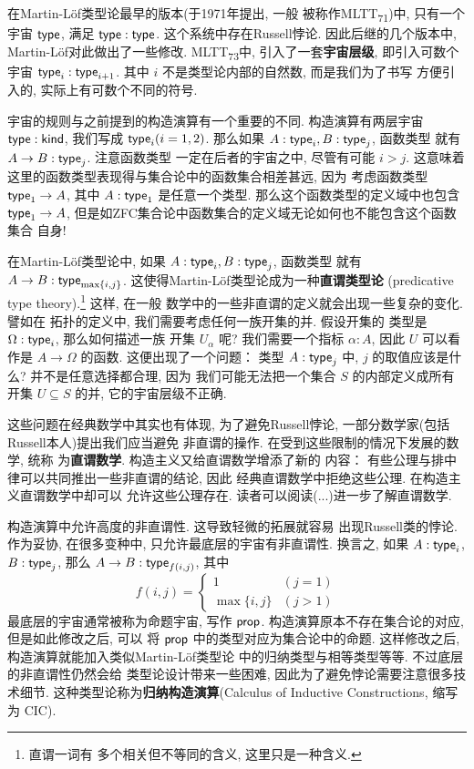 在Martin-L\"of类型论最早的版本(于1971年提出, 一般
被称作MLTT\textsubscript{71})中, 只有一个宇宙
\(\textsf{type}\), 满足 \(\textsf{type} : \textsf{type}\).
这个系统中存在Russell悖论. 因此后继的几个版本中,
Martin-L\"of对此做出了一些修改. MLTT\textsubscript{73}中,
引入了一套\textbf{宇宙层级}, 即引入可数个宇宙
\(\textsf{type}_i : \textsf{type}_{i+1}\).
其中 \(i\) 不是类型论内部的自然数, 而是我们为了书写
方便引入的, 实际上有可数个不同的符号.

宇宙的规则与之前提到的构造演算有一个重要的不同.
构造演算有两层宇宙 \(\textsf{type} : \textsf{kind}\),
我们写成 \(\textsf{type}_i (i = 1,2)\). 那么如果
\(A : \textsf{type}_i, B : \textsf{type}_j\), 函数类型
就有 \(A \to B : \textsf{type}_j\). 注意函数类型
一定在后者的宇宙之中, 尽管有可能 \(i > j\). 这意味着
这里的函数类型表现得与集合论中的函数集合相差甚远, 因为
考虑函数类型 \(\textsf{type}_1 \to A\), 其中 \(A : \textsf{type}_1\)
是任意一个类型. 那么这个函数类型的定义域中也包含 \(\textsf{type}_1 \to A\),
但是如ZFC集合论中函数集合的定义域无论如何也不能包含这个函数集合
自身!

在Martin-L\"of类型论中, 如果
\(A : \textsf{type}_i, B : \textsf{type}_j\), 函数类型
就有 \(A \to B : \textsf{type}_{\max\{i,j\}}\).
这使得Martin-L\"of类型论成为一种\textbf{直谓类型论}
(predicative type theory).\footnote{直谓一词有
多个相关但不等同的含义, 这里只是一种含义.} 这样, 在一般
数学中的一些非直谓的定义就会出现一些复杂的变化. 譬如在
拓扑的定义中, 我们需要考虑任何一族开集的并. 假设开集的
类型是 \(\Omega : \textsf{type}_i\), 那么如何描述一族
开集 \(U_\alpha\) 呢? 我们需要一个指标 \(\alpha : A\),
因此 \(U\) 可以看作是 \(A \to \Omega\) 的函数.
这便出现了一个问题： 类型 \(A : \textsf{type}_j\) 中,
\(j\) 的取值应该是什么? 并不是任意选择都合理, 因为
我们可能无法把一个集合 \(S\) 的内部定义成所有开集 \(U \subseteq S\)
的并, 它的宇宙层级不正确.

这些问题在经典数学中其实也有体现, 为了避免Russell悖论,
一部分数学家(包括Russell本人)提出我们应当避免
非直谓的操作. 在受到这些限制的情况下发展的数学, 统称
为\textbf{直谓数学}. 构造主义又给直谓数学增添了新的
内容： 有些公理与排中律可以共同推出一些非直谓的结论, 因此
经典直谓数学中拒绝这些公理. 在构造主义直谓数学中却可以
允许这些公理存在. 读者可以阅读(...)进一步了解直谓数学.

构造演算中允许高度的非直谓性. 这导致轻微的拓展就容易
出现Russell类的悖论. 作为妥协, 在很多变种中,
只允许最底层的宇宙有非直谓性. 换言之, 如果 \(A : \textsf{type}_i\),
\(B : \textsf{type}_j\), 那么
\(A \to B : \textsf{type}_{f(i,j)}\), 其中
\[f(i,j) = \begin{cases}
1 & (j = 1)\\
\max\{i,j\} & (j > 1)
\end{cases}\]
最底层的宇宙通常被称为命题宇宙, 写作 \(\textsf{prop}\).
构造演算原本不存在集合论的对应, 但是如此修改之后, 可以
将 \(\textsf{prop}\) 中的类型对应为集合论中的命题.
这样修改之后, 构造演算就能加入类似Martin-L\"of类型论
中的归纳类型与相等类型等等. 不过底层的非直谓性仍然会给
类型论设计带来一些困难, 因此为了避免悖论需要注意很多技术细节.
这种类型论称为\textbf{归纳构造演算}(Calculus of Inductive
Constructions, 缩写为 CIC).

